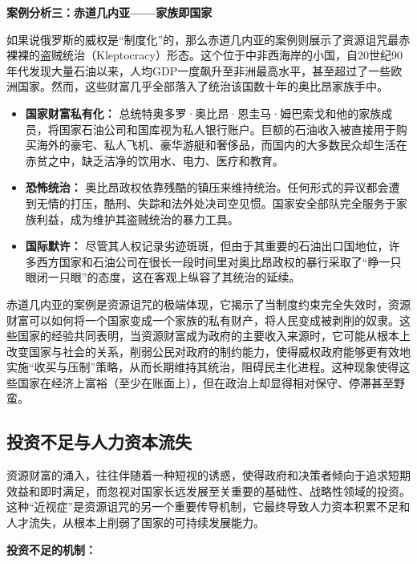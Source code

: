 \textbf{案例分析三：赤道几内亚——家族即国家}

如果说俄罗斯的威权是“制度化”的，那么赤道几内亚的案例则展示了资源诅咒最赤裸裸的盗贼统治（Kleptocracy）形态。这个位于中非西海岸的小国，自20世纪90年代发现大量石油以来，人均GDP一度飙升至非洲最高水平，甚至超过了一些欧洲国家。然而，这些财富几乎全部落入了统治该国数十年的奥比昂家族手中。

\begin{itemize}
    \item \textbf{国家财富私有化：} 总统特奥多罗·奥比昂·恩圭马·姆巴索戈和他的家族成员，将国家石油公司和国库视为私人银行账户。巨额的石油收入被直接用于购买海外的豪宅、私人飞机、豪华游艇和奢侈品，而国内的大多数民众却生活在赤贫之中，缺乏洁净的饮用水、电力、医疗和教育。
    \item \textbf{恐怖统治：} 奥比昂政权依靠残酷的镇压来维持统治。任何形式的异议都会遭到无情的打压，酷刑、失踪和法外处决司空见惯。国家安全部队完全服务于家族利益，成为维护其盗贼统治的暴力工具。
    \item \textbf{国际默许：} 尽管其人权记录劣迹斑斑，但由于其重要的石油出口国地位，许多西方国家和石油公司在很长一段时间里对奥比昂政权的暴行采取了“睁一只眼闭一只眼”的态度，这在客观上纵容了其统治的延续。
\end{itemize}

赤道几内亚的案例是资源诅咒的极端体现，它揭示了当制度约束完全失效时，资源财富可以如何将一个国家变成一个家族的私有财产，将人民变成被剥削的奴隶。这些国家的经验共同表明，当资源财富成为政府的主要收入来源时，它可能从根本上改变国家与社会的关系，削弱公民对政府的制约能力，使得威权政府能够更有效地实施“收买与压制”策略，从而长期维持其统治，阻碍民主化进程。这种现象使得这些国家在经济上富裕（至少在账面上），但在政治上却显得相对保守、停滞甚至野蛮。

\subsection{ 投资不足与人力资本流失}

资源财富的涌入，往往伴随着一种短视的诱惑，使得政府和决策者倾向于追求短期效益和即时满足，而忽视对国家长远发展至关重要的基础性、战略性领域的投资。这种“近视症”是资源诅咒的另一个重要传导机制，它最终导致人力资本积累不足和人才流失，从根本上削弱了国家的可持续发展能力。

\textbf{投资不足的机制：}

